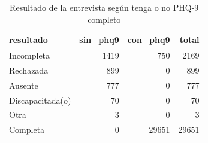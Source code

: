 \begin{table}[htbp]
\caption{Resultado de la entrevista según tenga o no PHQ-9 completo}
\label{tab:tabla_65_resultado_entrevista_phq9}
\begin{tabular}{lrrr}
\toprule
resultado & sin\_phq9 & con\_phq9 & total \\
\midrule
Incompleta & 1419 & 750 & 2169 \\
Rechazada & 899 & 0 & 899 \\
Ausente & 777 & 0 & 777 \\
Discapacitada(o) & 70 & 0 & 70 \\
Otra & 3 & 0 & 3 \\
Completa & 0 & 29651 & 29651 \\
\bottomrule
\end{tabular}
\end{table}
